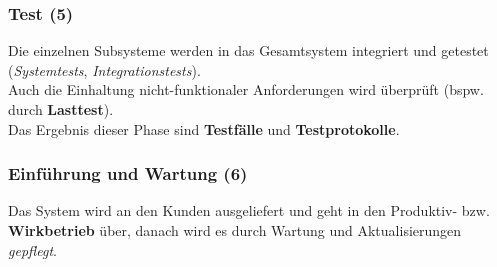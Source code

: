 \subsubsection{Test (5)}
Die einzelnen Subsysteme werden in das Gesamtsystem integriert und getestet (\textit{Systemtests}, \textit{Integrationstests}).\\
Auch die Einhaltung nicht-funktionaler Anforderungen wird überprüft (bspw. durch \textbf{Lasttest}).\\
Das Ergebnis dieser Phase sind \textbf{Testfälle} und \textbf{Testprotokolle}.

\subsubsection{Einführung und Wartung (6)}
Das System wird an den Kunden ausgeliefert und geht in den Produktiv- bzw. \textbf{Wirkbetrieb} über, danach wird es durch Wartung und Aktualisierungen \textit{gepflegt}.
